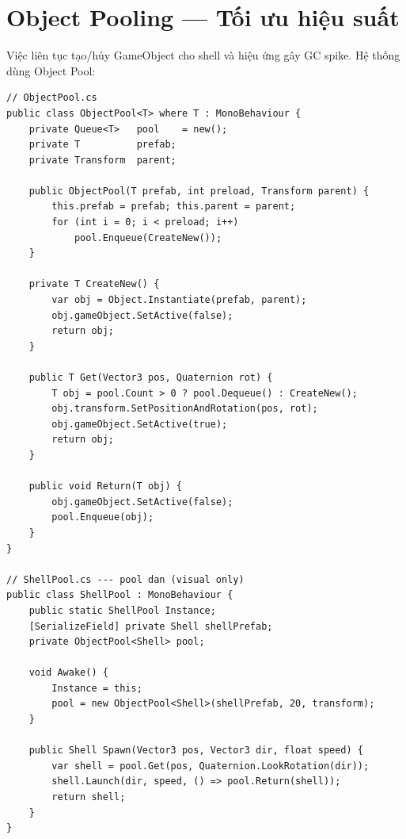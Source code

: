 \documentclass[12pt,a4paper]{report}
\begin{document}
\section{Object Pooling --- Tối ưu hiệu suất}

Việc liên tục tạo/hủy GameObject cho shell và hiệu ứng gây GC spike. Hệ thống dùng Object Pool:

\begin{lstlisting}[style=bashStyle, caption={Generic ObjectPool cho Shell và Effect}, label={lst:objpool}]
// ObjectPool.cs
public class ObjectPool<T> where T : MonoBehaviour {
    private Queue<T>   pool    = new();
    private T          prefab;
    private Transform  parent;

    public ObjectPool(T prefab, int preload, Transform parent) {
        this.prefab = prefab; this.parent = parent;
        for (int i = 0; i < preload; i++)
            pool.Enqueue(CreateNew());
    }

    private T CreateNew() {
        var obj = Object.Instantiate(prefab, parent);
        obj.gameObject.SetActive(false);
        return obj;
    }

    public T Get(Vector3 pos, Quaternion rot) {
        T obj = pool.Count > 0 ? pool.Dequeue() : CreateNew();
        obj.transform.SetPositionAndRotation(pos, rot);
        obj.gameObject.SetActive(true);
        return obj;
    }

    public void Return(T obj) {
        obj.gameObject.SetActive(false);
        pool.Enqueue(obj);
    }
}

// ShellPool.cs --- pool dan (visual only)
public class ShellPool : MonoBehaviour {
    public static ShellPool Instance;
    [SerializeField] private Shell shellPrefab;
    private ObjectPool<Shell> pool;

    void Awake() {
        Instance = this;
        pool = new ObjectPool<Shell>(shellPrefab, 20, transform);
    }

    public Shell Spawn(Vector3 pos, Vector3 dir, float speed) {
        var shell = pool.Get(pos, Quaternion.LookRotation(dir));
        shell.Launch(dir, speed, () => pool.Return(shell));
        return shell;
    }
}
\end{lstlisting}
\end{document}
